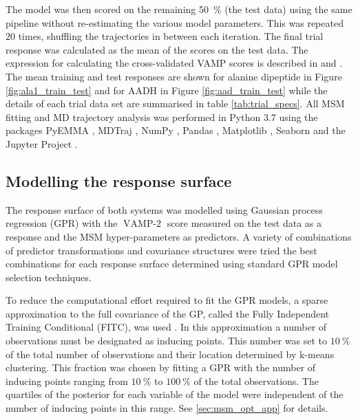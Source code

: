 The model was then scored on the remaining \SI{50}{\percent} (the test data) using the same pipeline without re-estimating the various model parameters. This was repeated $20$ times, shuffling the trajectories in between each iteration.  The final trial response was calculated as the mean of the scores on the test data. The expression for calculating the cross-validated VAMP scores is described in \cite{mcgibbonVariationalCrossvalidationSlow2015} and \cite{wuVariationalApproachLearning2019}.  The mean training and test responses are shown for alanine dipeptide in Figure \ref{fig:ala1_train_test} and for AADH in Figure \ref{fig:aad_train_test} while the details of each trial data set are summarised in table \ref{tab:trial_specs}. All MSM fitting and MD trajectory analysis was performed in Python 3.7 using the packages PyEMMA \cite{schererPyEMMASoftwarePackage2015a}, MDTraj \cite{mcgibbonMDTrajModernOpen2015}, NumPy \cite{waltNumPyArrayStructure2011}, Pandas \cite{mckinneyPandasFoundationalPython2011}, Matplotlib \cite{hunterMatplotlib2DGraphics2007},  Seaborn \cite{michaelwaskomMwaskomSeabornV02020} and the Jupyter Project \cite{kluyverJupyterNotebooksPublishing2016}. 

\subsection{Modelling the response surface}
The response surface of both systems was modelled using Gaussian process regression (GPR) with the $\operatorname{VAMP-2}$ score measured on the test data as a response and the MSM hyper-parameters as predictors. A variety of combinations of predictor transformations and covariance structures were tried the best combinations for each response surface determined using standard GPR model selection techniques. 

To reduce the computational effort required to fit the GPR models, a sparse approximation to the full covariance of the GP, called the Fully Independent Training Conditional (FITC), was used \cite{quinonero-candelaUnifyingViewSparse2005}. In this approximation a number of observations must be designated as inducing points. This number was set to $\SI{10}{\percent}$ of the total number of observations and their location determined by k-means clustering. This fraction was chosen by fitting a GPR with the number of inducing points ranging from $\SI{10}{\percent}$ to $\SI{100}{\percent}$ of the total observations. The quartiles of the posterior for each variable of the model were independent of the number of inducing points in this range. See \ref{sec:msm_opt_app} for details. 

